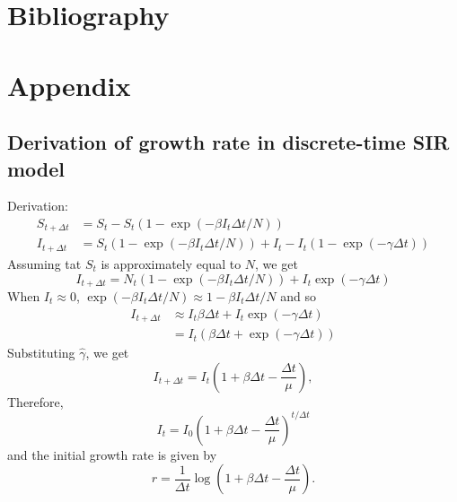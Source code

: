 \documentclass{article}
\begin{document}
\section{Bibliography}



\section{Appendix}

\subsection{Derivation of growth rate in discrete-time SIR model}


Derivation:
\begin{equation}
\begin{aligned}
S_{t+\Delta t} &= S_t - S_t (1- \exp(-\beta I_t \Delta t/N))\\
I_{t+\Delta t} &= S_t (1- \exp(-\beta I_t \Delta t/N)) + I_t - I_t (1- \exp(-\gamma \Delta t))
\end{aligned}
\end{equation}
Assuming tat $S_t$ is approximately equal to $N$, we get
\begin{equation}
I_{t+\Delta t} = N_t (1- \exp(-\beta I_t \Delta t/N)) + I_t \exp(-\gamma \Delta t)
\end{equation}
When $I_t \approx 0$, $\exp(-\beta I_t \Delta t/N) \approx 1 - \beta I_t \Delta t/N$ and so
\begin{equation}
\begin{aligned}
I_{t+\Delta t} &\approx  I_t \beta \Delta t + I_t \exp(-\gamma \Delta t)\\
&= I_t (\beta \Delta t + \exp(-\gamma \Delta t))
\end{aligned}
\end{equation}
Substituting $\hat{\gamma}$, we get
\begin{equation}
I_{t+\Delta t} = I_t \left(1 + \beta \Delta t - \frac{\Delta t}{\mu}\right),
\end{equation}
Therefore,
\begin{equation}
I_{t} = I_0 \left(1 + \beta\Delta t - \frac{\Delta t}{\mu}\right)^{t/\Delta t}
\end{equation}
and the initial growth rate is given by
\begin{equation}
r = \frac{1}{\Delta t} \log \left(1 + \beta \Delta t - \frac{\Delta t}{\mu}\right).
\end{equation}
\end{document}
